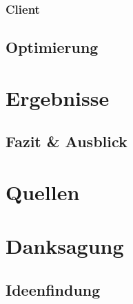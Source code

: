 \documentclass[a4paper,12pt,ngerman]{scrreport}
\begin{document}
    \subsection{Client}
    \section{Optimierung}

    \chapter{Ergebnisse}
    \section{Fazit & Ausblick}
    \chapter{Quellen}
    \chapter{Danksagung}

    \section{Ideenfindung}
\end{document}
